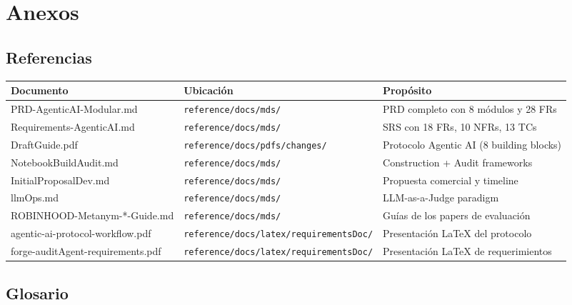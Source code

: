 \documentclass[12pt,a4paper]{article}
\begin{document}
\section{Anexos}

\subsection{Referencias}

\begin{longtable}{llp{}}
\toprule
\textbf{Documento} & \textbf{Ubicación} & \textbf{Propósito} \\
\midrule
\endhead
\bottomrule
\endfoot
PRD-AgenticAI-Modular.md        & \texttt{reference/docs/mds/} & PRD completo con 8 módulos y 28 FRs \\
Requirements-AgenticAI.md       & \texttt{reference/docs/mds/} & SRS con 18 FRs, 10 NFRs, 13 TCs \\
DraftGuide.pdf                  & \texttt{reference/docs/pdfs/changes/} & Protocolo Agentic AI (8 building blocks) \\
NotebookBuildAudit.md           & \texttt{reference/docs/mds/} & Construction + Audit frameworks \\
InitialProposalDev.md           & \texttt{reference/docs/mds/} & Propuesta comercial y timeline \\
llmOps.md                       & \texttt{reference/docs/mds/} & LLM-as-a-Judge paradigm \\
ROBINHOOD-Metanym-*-Guide.md    & \texttt{reference/docs/mds/} & Guías de los papers de evaluación \\
agentic-ai-protocol-workflow.pdf & \texttt{reference/docs/latex/requirementsDoc/} & Presentación LaTeX del protocolo \\
forge-auditAgent-requirements.pdf & \texttt{reference/docs/latex/requirementsDoc/} & Presentación LaTeX de requerimientos \\
\bottomrule
\end{longtable}

\subsection{Glosario}
\end{document}
